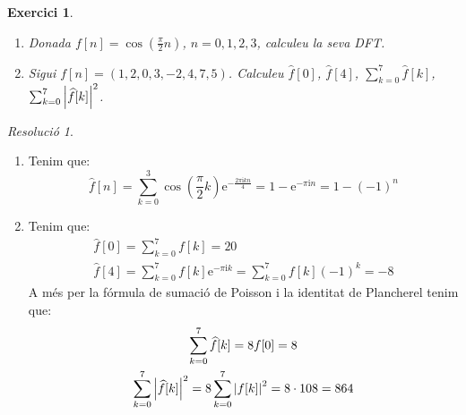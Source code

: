 \documentclass[10pt,a4paper]{article}
\newcommand{\ii}{\mathrm{i}} %
\newtheorem{exercici}{Exercici}
\theoremstyle{definition}
\theoremstyle{remark}
\newtheorem*{res}{Resolució}
\renewcommand{\exp}[1]{\mathrm{e}^{#1}} %
\begin{document}
\begin{exercici}\hfill
  \begin{enumerate}
    \item Donada $f[n]=\cos(\frac{\pi}{2}n)$, $n=0,1,2,3$, calculeu la seva DFT.
    \item Sigui $f[n]=(1,2,0,3,-2,4,7,5)$. Calculeu $\widehat{f}[0]$, $\widehat{f}[4]$, $\sum_{k=0}^{7}\widehat{f}[k]$, $\sum_{k=0}^{7}\abs{\widehat{f}[k]}^2$.
  \end{enumerate}
\end{exercici}
\begin{res}\hfill
  \begin{enumerate}
    \item Tenim que:
          $$\widehat{f}[n]=\sum_{k=0}^{3}\cos(\frac{\pi}{2}k)\exp{-\frac{2\pi\ii kn}{4}}=1-\exp{-\pi\ii n}=1-{(-1)}^n$$
    \item Tenim que:
          \begin{gather*}
            \widehat{f}[0] =\sum_{k=0}^{7}f[k]=20                                                         \\
            \widehat{f}[4] =\sum_{k=0}^{7}f[k]\exp{-\pi\ii k}=\sum_{k=0}^{7}f[k]{(-1)}^k=-8
          \end{gather*}
          A més per la fórmula de sumació de Poisson i la identitat de Plancherel tenim que:
          \begin{gather*}
            \sum_{k=0}^{7}\widehat{f}[k]=8f[0]=8\\
            \sum_{k=0}^{7}\abs{\widehat{f}[k]}^2=8\sum_{k=0}^{7}\abs{{f}[k]}^2=8\cdot 108=864
          \end{gather*}
  \end{enumerate}
\end{res}
\end{document}
